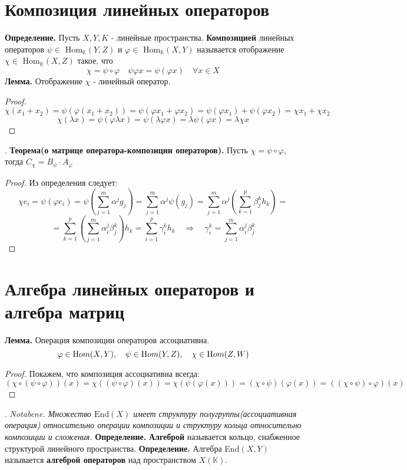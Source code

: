\documentclass{article}
\newcommand*{\lemma}[1]{\textbf{Лемма.} #1. \newline}
\newcommand*{\theorem}[2]{\textbf{Теорема#1. } #2 \newline}
\newcommand*{\notabene}[1]{\textit{Notabene. #1.} \newline}
\newcommand*{\definition}[1]{\textbf{Определение.} #1 \newline}
\newcommand*{\Hom}[2]{Hom$_\mathbb{K}(#1, #2)$}
\begin{document}
\section{Композиция линейных операторов}
\definition{Пусть $X, Y, K$ - линейные пространства. \textbf{Композицией} линейных операторов $\psi \in$ \Hom Y Z и $\varphi \in$ \Hom X Y называется отображение $\chi \in$ \Hom X Z такое, что}
$$
    \chi = \psi \circ \varphi \quad \psi \varphi x = \psi(\varphi x) \quad \forall x \in X
$$
\lemma{Отображение $\chi$ - линейный оператор}
\begin{proof}
    $$
        \chi (x_1 + x_2) = \psi(\varphi(x_1 + x_2)) = \psi(\varphi x_1 + \varphi x_2) = \psi (\varphi x_1) + \psi(\varphi x_2) = \chi x_1 + \chi x_2
    $$
    $$
        \chi (\lambda x) = \psi (\varphi \lambda x) = \psi (\lambda \varphi x) = \lambda\psi(\varphi x) = \lambda \chi x
    $$
\end{proof}
.\newline 
\theorem{(о матрице оператора-композиции операторов)}{Пусть $\chi = \psi \circ \varphi$, тогда $C_\chi = B_\psi \cdot A_\varphi$}
\begin{proof}
    Из определения следует: 
    $$
        \chi e_i = \psi (\varphi e_i) = \psi(\sum_{j = 1}^{m} \alpha^j g_j) = \sum_{j = 1}^{m} \alpha^j\psi(g_j) = \sum_{j = 1}^{m}\alpha^j(\sum_{k = 1}^{p} \beta^k_j h_k) = 
    $$
    $$
        = \sum_{k = 1}^{p}(\sum_{j = 1}^{m} \alpha_i^j \beta^k_j) h_k = \sum_{i = 1}^{p} \gamma^k_i h_k \quad \Rightarrow \quad \gamma^k_i = \sum_{j = 1}^{m} \alpha_i^j \beta^k_j
    $$
\end{proof}
\section{Алгебра линейных операторов и алгебра матриц}
\lemma{Операция композиции операторов ассоциативна}
    $$
        \varphi \in \text Hom (X, Y), \quad \psi \in  \text Hom (Y, Z), \quad \chi \in \text Hom (Z, W) 
    $$
\begin{proof}
    Покажем, что композиция ассоциативна всегда: 
    $$  
        (\chi \circ (\psi \circ \varphi))(x) = \chi ((\psi \circ \varphi)(x)) = \chi(\psi(\varphi(x))) = (\chi \circ \psi)(\varphi(x)) = ((\chi \circ \psi) \circ \varphi)(x)
    $$
\end{proof}
.\newline 
\notabene{Множество $\text{End}(X)$ имеет структуру полугруппы(ассоциативная операция) относительно операции композиции и структуру кольца относительно композиции и сложения}
\newline
\definition{\textbf{Алгеброй} называется кольцо, снабженное структурой линейного пространства.}
\newline
\definition{Алгебра End$(X, Y)$ называется \textbf{алгеброй операторов} над пространством $X(\mathbb{K})$.}
\end{document}
